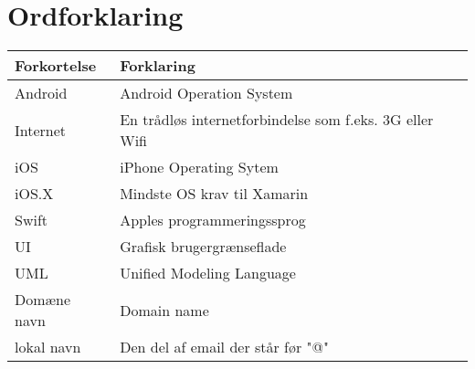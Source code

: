 \chapter*{Ordforklaring}

\begin{tabularx}{\textwidth}{l l X} \hline
	\textbf{Forkortelse}  & \textbf{Forklaring} \\ \hline
	Android& Android Operation System& \\
	Internet& En trådløs internetforbindelse som f.eks. 3G eller Wifi& \\
	iOS&  iPhone Operating Sytem& \\
	iOS.X& Mindste OS krav til Xamarin \\
	Swift& Apples programmeringssprog& \\
	UI& Grafisk brugergrænseflade& \\
	UML& Unified Modeling Language& \\
	Domæne navn& Domain name\cite{DM}\\
	lokal navn& Den del af email der står før "@"\\
\end{tabularx}
